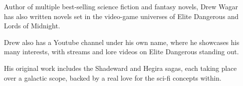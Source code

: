 Author of multiple best-selling science fiction and fantasy novels, Drew Wagar has also written novels set in the video-game universes of Elite Dangerous and Lords of Midnight. 

Drew also has a Youtube channel under his own name, where he showcases his many interests, with streams and lore videos on Elite Dangerous standing out. 

His original work includes the Shadeward and Hegira sagas, each taking place over a galactic scope, backed by a real love for the sci-fi concepts within. 
